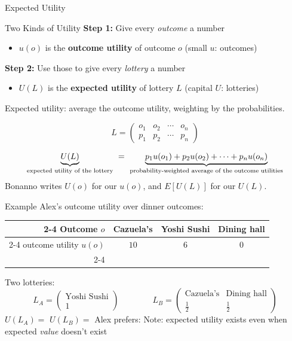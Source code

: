 
\begin{frame}[standout]
Expected Utility
\end{frame}

\begin{frame}{Two Kinds of Utility}
\textbf{Step 1:} Give every \textit{outcome} a number
\begin{itemize}
    \item $u(o)$ is the \textbf{outcome utility} of outcome $o$ \hfill (small $u$: outcomes)
\end{itemize}
\bsk
\textbf{Step 2:} Use those to give every \textit{lottery} a number
\begin{itemize}
    \item $U(L)$ is the \textbf{expected utility} of lottery $L$ \hfill (capital $U$: lotteries)
\end{itemize}
\bsk
Expected utility: average the outcome utility, weighting by the probabilities.

$$
L = \begin{pmatrix}
    o_1 & o_2 & \cdots & o_n \\
    p_1 & p_2 & \cdots & p_n
\end{pmatrix}
$$

$$\underbrace{U(L)\vphantom{p_1}}_{\text{expected utility of the lottery}}\ =\ \underbrace{p_1u(o_1)+p_2u(o_2)+\cdots+p_nu(o_n)}_{\text{probability-weighted average of the outcome utilities}}$$
\vfill
{\footnotesize Bonanno writes $U(o)$ for our $u(o)$, and $E[U(L)]$ for our $U(L)$.}
\vspace{-0.2in}
\end{frame}

\begin{frame}{Example}
Alex's outcome utility over dinner outcomes:
\bsk
\centering
\begin{tabular}{r|c|c|c|}
\cline{2-4}
Outcome $o$ & Cazuela's & Yoshi Sushi & Dining hall \\
\cline{2-4}
outcome utility $u(o)$ & $10$ & $6$ & $0$ \\
\cline{2-4}
\end{tabular}
\bsk
\raggedright
Two lotteries:
$$L_A=\begin{pmatrix} \text{Yoshi Sushi} \\[2pt] 1\end{pmatrix}
\qquad\qquad
L_B=\begin{pmatrix} \text{Cazuela's} & \text{Dining hall} \\[2pt] \tfrac12 & \tfrac12\end{pmatrix}$$
\bsk
$U(L_A)=$ \hspace{2.2in} $U(L_B)=$
\vfill
Alex prefers: \underline{\hspace{1in}}
\bsk
Note: expected utility exists even when expected \textit{value} doesn't exist
\vspace{-0.3in}
\end{frame}

